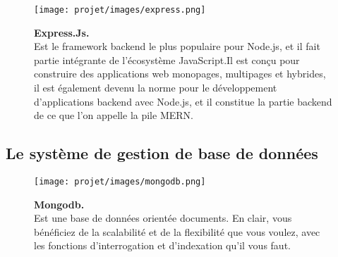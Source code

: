 \begin{figure}[H]
    \centering
    \begin{minipage}[c]{0.3\textwidth}
        \texttt{[image: projet/images/express.png]}
    \end{minipage}
    \hspace{1cm}
    \begin{minipage}[c]{0.6\textwidth}
        \textbf{Express.Js.}\\[0.5em]
     Est le framework backend le plus populaire pour Node.js, et il fait partie intégrante de l’écosystème JavaScript.Il est conçu pour construire des applications web monopages, multipages et hybrides, il est également devenu la norme pour le développement d’applications backend avec Node.js, et il constitue la partie backend de ce que l’on appelle la pile MERN. \cite{ref14}
    \end{minipage}
\end{figure}
\subsection{Le système de gestion de base de données}
\begin{figure}[H]
    \centering
    \begin{minipage}[c]{0.3\textwidth}
        \texttt{[image: projet/images/mongodb.png]}
    \end{minipage}
    \hspace{1cm}
    \begin{minipage}[c]{0.6\textwidth}
        \textbf{Mongodb.}\\[0.5em]
     Est une base de données orientée documents. En clair, vous bénéficiez de la scalabilité et de la flexibilité que vous voulez, avec les fonctions d’interrogation et d’indexation qu’il vous faut. \cite{ref15}
    \end{minipage}
\end{figure}
